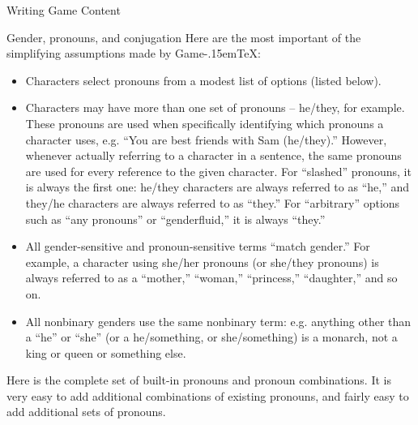 \documentclass[11pt]{article}
\def\gametex{\mbox{Game\kern-.15em\TeX}}
\begin{document}
\begin{section}{Writing Game Content}
\begin{subsection}{Gender, pronouns, and conjugation}
Here are the most important of the simplifying assumptions made by \gametex{}:

\begin{itemize}
\item Characters select pronouns from a modest list of options (listed below).
\item Characters may have more than one set of pronouns -- he/they, for example.  These pronouns are used when specifically identifying which pronouns a character uses, e.g. ``You are best friends with Sam (he/they).'' However, whenever actually referring to a character in a sentence, the same pronouns are used for every reference to the given character.  For ``slashed'' pronouns, it is always the first one: he/they characters are always referred to as ``he,'' and they/he characters are always referred to as ``they.''  For ``arbitrary'' options such as ``any pronouns'' or ``genderfluid,'' it is always ``they.''
\item All gender-sensitive and pronoun-sensitive terms ``match gender.''  For example, a character using she/her pronouns (or she/they pronouns) is always referred to as a ``mother,'' ``woman,'' ``princess,'' ``daughter,'' and so on.
\item All nonbinary genders use the same nonbinary term: e.g. anything other than a ``he'' or ``she'' (or a he/something, or she/something) is a monarch, not a king or queen or something else.
\end{itemize}

Here is the complete set of built-in pronouns and pronoun combinations.  It is very easy to add additional combinations of existing pronouns, and fairly easy to add additional sets of pronouns.


\end{subsection}
\end{section}
\end{document}
